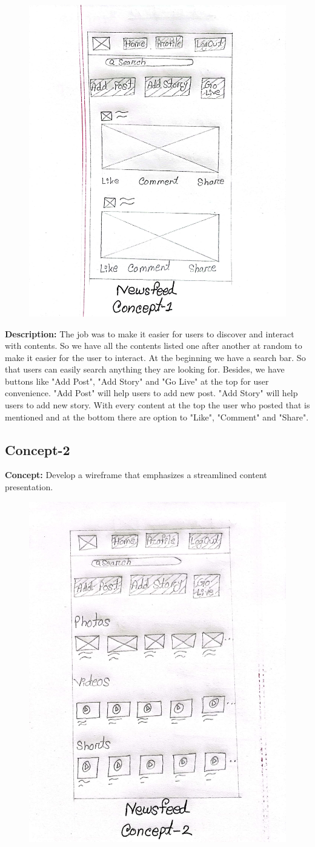 \documentclass{report}
\begin{document}
\begin{figure}[h]
    \centering
    \includegraphics[width=0.5\linewidth]{3.jpg}
    \label{fig:enter-label}
\end{figure}

\textbf{Description: }The job was to make it easier for users to discover and interact with contents. So we have all the contents listed one after another at random to make it easier for the user to interact. At the beginning we have a search bar. So that users can easily search anything they are looking for. Besides, we have buttons like "Add Post", "Add Story" and "Go Live" at the top for user convenience. "Add Post" will help users to add new post. "Add Story" will help users to add new story. With every content at the top the user who posted that is mentioned and at the bottom there are option to "Like", "Comment" and "Share".



\newpage



\subsection{Concept-2}
\textbf{Concept: }Develop a wireframe that emphasizes a streamlined content presentation.

\begin{figure}[htb]
    \centering
    \includegraphics[width=0.5\linewidth]{4.jpg}
    \label{fig:enter-label}
\end{figure}
\end{document}
